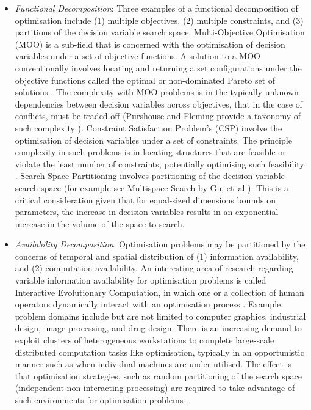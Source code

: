 \begin{itemize}
	\item \emph{Functional Decomposition}: Three examples of a functional decomposition of optimisation include (1) multiple objectives, (2) multiple constraints, and (3) partitions of the decision variable search space. Multi-Objective Optimisation (MOO) is a sub-field that is concerned with the optimisation of decision variables under a set of objective functions. A solution to a MOO conventionally involves locating and returning a set configurations under the objective functions called the optimal or non-dominated Pareto set of solutions \cite{Deb2001}. The complexity with MOO problems is in the typically unknown dependencies between decision variables across objectives, that in the case of conflicts, must be traded off (Purshouse and Fleming provide a taxonomy of such complexity \cite{Purshouse2003}). Constraint Satisfaction Problem's (CSP) involve the optimisation of decision variables under a set of constraints. The principle complexity in such problems is in locating structures that are feasible or violate the least number of constraints, potentially optimising such feasibility \cite{Tsang1993, Kumar1992}. Search Space Partitioning involves partitioning of the decision variable search space (for example see Multispace Search by Gu, et~al \cite{Du1997, Gu1997, Gu1994}). This is a critical consideration given that for equal-sized dimensions bounds on parameters, the increase in decision variables results in an exponential increase in the volume of the space to search.
			
	\item \emph{Availability Decomposition}: Optimisation problems may be partitioned by the concerns of temporal and spatial distribution of (1) information availability, and (2) computation availability. An interesting area of research regarding variable information availability for optimisation problems is called Interactive Evolutionary Computation, in which one or a collection of human operators dynamically interact with an optimisation process \cite{Takagi2001}. Example problem domains include but are not limited to computer graphics, industrial design, image processing, and drug design. There is an increasing demand to exploit clusters of heterogeneous workstations to complete large-scale distributed computation tasks like optimisation, typically in an opportunistic manner such as when individual machines are under utilised. The effect is that optimisation strategies, such as random partitioning of the search space (independent non-interacting processing) are required to take advantage of such environments for optimisation problems \cite{Schnekenburger1993, Liu2000}.
	

\end{itemize}
